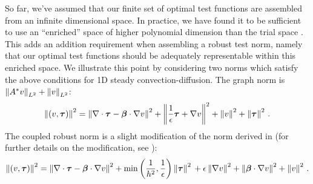 \documentclass{article}
\begin{document}
So far, we've assumed that our finite set of optimal test functions are assembled from an infinite dimensional space.
In practice, we have found it to be sufficient to use an ``enriched'' space of higher
polynomial dimension than the trial space \cite{PracticalDPG}.
This adds an addition requirement when assembling a robust test norm, namely that our optimal test functions should be adequately representable within this enriched space.
We illustrate this point by considering two norms which satisfy the above conditions for 1D steady convection-diffusion.
The graph norm is $\left\| A^*v \right\|_{L^2}+\left\| v \right\|_{L^2}$:
\begin{equation*}
\left\| (v,\boldsymbol\tau) \right\|^2=
\left\| \nabla\cdot\boldsymbol\tau-\boldsymbol\beta\cdot\nabla v \right\|^2
+\left\| \frac{1}{\epsilon}\boldsymbol\tau+\nabla v \right\|^2
+\left\| v \right\|^2
+\left\| \boldsymbol\tau \right\|^2\,.
\end{equation*}
The coupled robust norm is a slight modification of the norm derived in \cite{ChanHeuerThanhDemkowicz2012} 
(for further details on the modification, see \cite{JesseDissertation}):
\begin{equation*}
\left\| (v,\boldsymbol\tau) \right\|^2=
\left\| \nabla\cdot\boldsymbol\tau-\boldsymbol\beta\cdot\nabla v \right\|^2
+\min\left( \frac{1}{h^2},\frac{1}{\epsilon} \right)\left\| \boldsymbol\tau \right\|^2\\
+\epsilon\left\| \nabla v \right\|^2
+\left\| \boldsymbol\beta\cdot\nabla v \right\|^2
+\left\| v \right\|^2\,.
\end{equation*}
\end{document}
